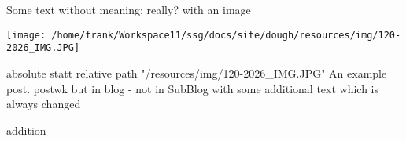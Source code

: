 \documentclass[a4paper,10pt]{scrbook}
\begin{document}
Some text without meaning; really? with an image

\texttt{[image: /home/frank/Workspace11/ssg/docs/site/dough/resources/img/120-2026\_IMG.JPG]}

absolute statt relative path "/resources/img/120-2026\_IMG.JPG" An
example post. postwk but in blog - not in SubBlog with some additional
text which is always changed

addition


\printindex
\end{document}
